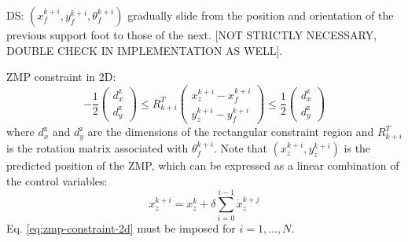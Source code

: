 DS: $(x_f^{k+i}, y_f^{k+i}, \theta_f^{k+i})$ gradually slide from the position 
and orientation of the previous support foot to those of the next. [NOT 
STRICTLY NECESSARY, DOUBLE CHECK IN IMPLEMENTATION AS WELL].

ZMP constraint in 2D:
\begin{equation}
  \label{eq:zmp-constraint-2d}
  -\frac{1}{2}
  \begin{pmatrix}
    d_x^\text{z} \\
    d_y^\text{z}
  \end{pmatrix}
  \le
  R_{k+i}^T
  \begin{pmatrix}
    x_z^{k+i} - x_f^{k+i} \\
    y_z^{k+i} - y_f^{k+i}
  \end{pmatrix}
  \le
  \frac{1}{2}
  \begin{pmatrix}
    d_x^\text{z} \\
    d_y^\text{z}
  \end{pmatrix}
\end{equation}
where $d_x^\text{z}$ and $d_y^\text{z}$ are the dimensions of the rectangular
constraint region and $R_{k+i}^T$ is the rotation matrix associated with
$\theta_f^{k+i}$. Note that $(x_z^{k+i}, y_z^{k+i})$ is the predicted position
of the ZMP, which can be expressed as a linear combination of the control
variables:
\begin{equation}
  \label{eq:piecewise-linear-zmp-trajectory}
  x_z^{k+i} = x_z^k + \delta \sum_{i=0}^{i-1} \dot{x}_z^{k+j}
\end{equation}
Eq. \eqref{eq:zmp-constraint-2d} must be imposed for $i = 1, \dots, N$.

